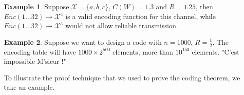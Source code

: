 \documentclass[twoside]{article}
\theoremstyle{definition} %
\newtheorem{example}{Example}
\def\X{\mathcal{X}}
\begin{document}
\begin{example}
  Suppose $\X = \{a,b,c\}$, $C(W)=1.3$ and $R=1.25$, then $Enc(1 \dots 32) \to \X^4$ is a valid encoding function for this channel, while $Enc(1 \dots 32) \to \X^5$ would not allow reliable transmission.
\end{example}

\begin{example}
  Suppose we want to design a code with $n=1000$, $R=\frac 1 2$. The encoding table will have $1000 \times 2^{500}$ elements, more than $10^{153}$ elements. "C'est impossible M'sieur !"
\end{example}




To illustrate the proof technique that we used to prove the coding theorem, we take an example.
\end{document}
